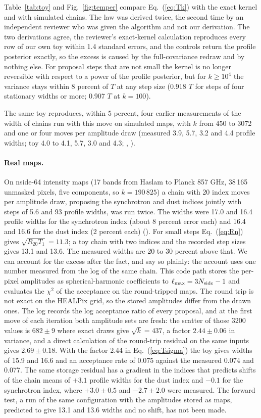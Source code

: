 Table~\ref{tab:toy} and Fig.~\ref{fig:temper} compare Eq.~(\ref{eq:Tk}) with the exact kernel and with
simulated chains. The law was derived twice, the second time by an independent reviewer who was given
the algorithm and not our derivation. The two derivations agree, the reviewer's exact-kernel
calculation reproduces every row of our own toy within 1.4 standard errors, and the controls return
the profile posterior exactly, so the excess is caused by the full-covariance redraw and by nothing
else. For proposal steps that are not small the kernel is no longer reversible with respect to a
power of the profile posterior, but for $k \ge 10^4$ the variance stays within 8 percent of $T$ at any
step size (0.918 $T$ for steps of four stationary widths or more; 0.907 $T$ at $k = 100$).

The same toy reproduces, within 5 percent, four earlier measurements of the width of chains run with
this move on simulated maps, with $k$ from 450 to 3072 and one or four moves per amplitude draw
(measured 3.9, 5.7, 3.2 and 4.4 profile widths; toy 4.0 to 4.1, 5.7, 3.0 and 4.3; ,
).

\paragraph{Real maps.} On nside-64 intensity maps (17 bands from Haslam to Planck 857 GHz, 38\,165
unmasked pixels, five components, so $k = 190\,825$) a chain with 20 index moves per amplitude draw,
proposing the synchrotron and dust indices jointly with steps of 5.6 and 93 profile widths, was run
twice. The widths were 17.0 and 16.4 profile widths for the synchrotron index (about 8 percent error
each) and 16.4 and 16.6 for the dust index (2 percent each) (). For small steps
Eq.~(\ref{eq:Rn}) gives $\sqrt{R_{20}T_1} = 11.3$; a toy chain with two indices and the recorded step
sizes gives 13.1 and 13.6. The measured widths are 20 to 30 percent above that. We can account for the
excess after the fact, and say so plainly: the account uses one number measured from the log of the
same chain. This code path stores the per-pixel amplitudes as spherical-harmonic coefficients to
$\ell_{\max} = 3 N_{\rm side} - 1$ and evaluates the $\chi^2$ of the acceptance on the round-tripped
maps. The round trip is not exact on the HEALPix grid, so the stored amplitudes differ from the drawn
ones. The log records the log acceptance ratio of every proposal, and at the first move of each
iteration both amplitude sets are fresh: the scatter of those 3200 values is $682 \pm 9$ where exact
draws give $\sqrt{k} = 437$, a factor $2.44 \pm 0.06$ in variance, and a direct calculation of the
round-trip residual on the same inputs gives $2.69 \pm 0.18$. With the factor 2.44 in
Eq.~(\ref{eq:Tsigma}) the toy gives widths of 15.9 and 16.6 and an acceptance rate of 0.075 against
the measured 0.074 and 0.077. The same storage residual has a gradient in the indices that predicts
shifts of the chain means of $+3.1$ profile widths for the dust index and $-0.1$ for the synchrotron
index, where $+3.0 \pm 0.5$ and $-2.7 \pm 2.0$ were measured. The forward test, a run of the same
configuration with the amplitudes stored as maps, predicted to give 13.1 and 13.6 widths and no
shift, has not been made.

